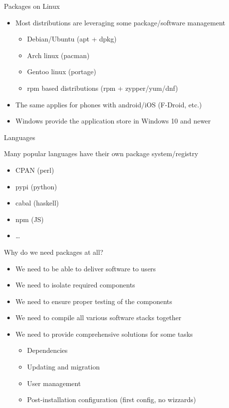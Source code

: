 \documentclass{beamer}
\begin{document}
\begin{frame}[t]{Packages on Linux}
	\begin{itemize}
	\item Most distributions are leveraging some package/software management
    \begin{itemize}
      \item Debian/Ubuntu (apt + dpkg)
      \item Arch linux (pacman)
      \item Gentoo linux (portage)
      \item rpm based distributions (rpm + zypper/yum/dnf)
    \end{itemize}
    \item The same applies for phones with android/iOS (F-Droid, etc.)
    \item Windows provide the application store in Windows 10 and newer
  \end{itemize}
\end{frame}

\begin{frame}[t]{Languages}
  \begin{center}Many popular languages have their own package system/registry\end{center}
    \begin{itemize}
      \item CPAN (perl)
      \item pypi (python)
      \item cabal (haskell)
      \item npm (JS)
      \item \ldots
    \end{itemize}
\end{frame}

\begin{frame}[t]{Why do we need packages at all?}
	\begin{itemize}
	\item We need to be able to deliver software to users
    \item We need to isolate required components
	\item We need to ensure proper testing of the components
	\item We need to compile all various software stacks together
	\item We need to provide comprehensive solutions for some tasks
    \begin{itemize}
      \item Dependencies
      \item Updating and migration
      \item User management
      \item Post-installation configuration (first config, no wizzards)
    \end{itemize}
	\end{itemize}
\end{frame}
\end{document}
